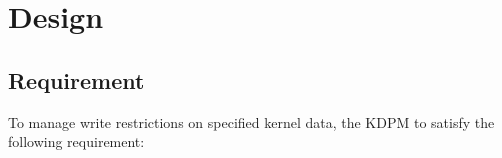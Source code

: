 \section{Design} \label{section:approach}

\subsection{Requirement} \label{subsection:design}

To manage write restrictions on specified kernel data, 
the KDPM to satisfy the following requirement: 


